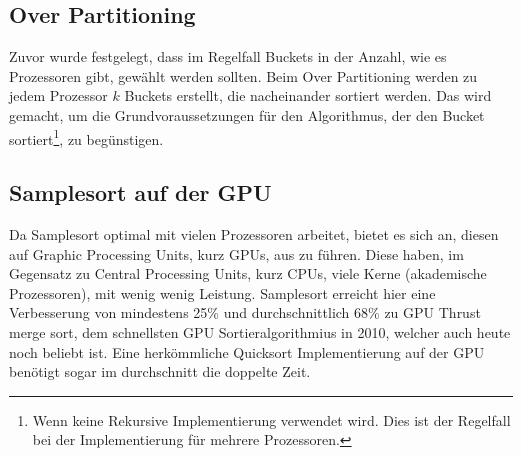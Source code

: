 	\subsection{Over Partitioning}
		Zuvor wurde festgelegt, dass im Regelfall Buckets in der Anzahl, wie es Prozessoren gibt, gewählt werden sollten.
		Beim Over Partitioning werden zu jedem Prozessor $k$ Buckets erstellt, die nacheinander sortiert werden.
		Das wird gemacht, um die Grundvoraussetzungen für den Algorithmus, der den Bucket sortiert\footnote{Wenn keine Rekursive Implementierung verwendet wird. Dies ist der Regelfall bei der Implementierung für mehrere Prozessoren.}, zu begünstigen.
	
	\subsection{Samplesort auf der GPU}
		Da Samplesort optimal mit vielen Prozessoren arbeitet, bietet es sich an, diesen auf Graphic Processing Units, kurz GPUs, aus zu führen.
		Diese haben, im Gegensatz zu Central Processing Units, kurz CPUs, viele Kerne (akademische Prozessoren), mit wenig wenig Leistung. \autocite{wikipedia-contributors-2022B}
		Samplesort erreicht hier eine Verbesserung von mindestens 25\% und durchschnittlich 68\% zu GPU Thrust merge sort, \autocite{leischner-2010} dem schnellsten GPU Sortieralgorithmius in 2010, welcher auch heute noch beliebt ist. \autocite{unknown-author-2016}
		Eine herkömmliche Quicksort Implementierung auf der GPU benötigt sogar im durchschnitt die doppelte Zeit.
